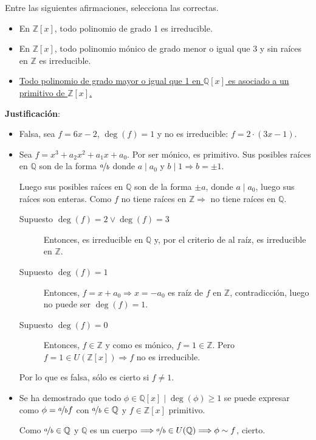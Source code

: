 \begin{ejercicio}
    Entre las siguientes afirmaciones, selecciona las correctas.
    \begin{itemize}
        \item En $\mathbb{Z}[x]$, todo polinomio de grado 1 es irreducible.
        \item En $\mathbb{Z}[x]$, todo polinomio mónico de grado menor o igual que 3 y sin raíces en $\mathbb{Z}$ es irreducible.
    \item \underline{Todo polinomio de grado mayor o igual que 1 en $\mathbb{Q}[x]$ es asociado a un}\newline
        \underline{ primitivo de $\mathbb{Z}[x]$.}
    \end{itemize}

    \noindent
    \textbf{Justificación}:
    \begin{itemize}
        \item Falsa, sea $f=6x-2$, $\deg(f)=1$ y no es irreducible: $f=2\cdot (3x-1)$.
        \item Sea $f = x^3 + a_2 x^2 + a_1x + a_0$. Por ser mónico, es primitivo. Sus posibles raíces en $\mathbb{Q}$ son de la forma $\nicefrac{a}{b}$ donde $a\mid a_0$ y $b\mid 1 \Longrightarrow b = \pm 1$. 

            Luego sus posibles raíces en $\mathbb{Q}$ son de la forma $\pm a$, donde $a\mid a_0$, luego sus raíces son enteras. Como $f$ no tiene raíces en $\mathbb{Z} \Longrightarrow $ no tiene raíces en $\mathbb{Q}$.

            \begin{description}
                \item [Supuesto $\deg(f)=2 \lor \deg(f)=3$] Entonces, es irreducible en $\mathbb{Q}$ y, por el criterio de al raíz, es irreducible en $\mathbb{Z}$.
                \item [Supuesto $\deg(f)=1$] Entonces, $f=x+a_0 \Longrightarrow x=-a_0$ es raíz de $f$ en $\mathbb{Z}$, contradicción, luego no puede ser $\deg(f)=1$.
                \item [Supuesto $\deg(f)=0$] Entonces, $f\in \mathbb{Z}$ y como es mónico, $f=1\in \mathbb{Z}$. Pero $f=1\in U(\mathbb{Z}[x]) \Longrightarrow f$ no es irreducible.
            \end{description}
            Por lo que es falsa, sólo es cierto si $f\neq 1$.
            
        \item Se ha demostrado que todo $\phi \in \mathbb{Q}[x] \mid \deg(\phi)\geq1$  se puede expresar como $\phi = \nicefrac{a}{b}f$ con $\nicefrac{a}{b}\in \mathbb{Q}$ y $f\in \mathbb{Z}[x]$ primitivo.

            Como $\nicefrac{a}{b}\in \mathbb{Q}$ y $\mathbb{Q}$ es un cuerpo $\Longrightarrow \nicefrac{a}{b}\in U(\mathbb{Q})\Longrightarrow \phi \sim f$, cierto.
    \end{itemize}
\end{ejercicio}


